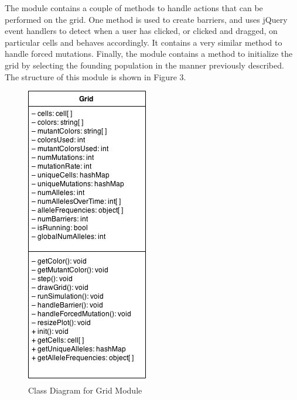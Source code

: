 \documentclass[12pt]{article}
\begin{document}
\begin{spacing}{1.5}
The module contains a couple of methods to handle actions that can be performed on the grid. One method is used to create barriers, and uses jQuery event handlers to detect when a user has clicked, or clicked and dragged, on particular cells and behaves accordingly. It contains a very similar method to handle forced mutations.\newline
\newline
Finally, the module contains a method to initialize the grid by selecting the founding population in the manner previously described. The structure of this module is shown in Figure 3.
\begin{figure}[h]
\caption{Class Diagram for Grid Module}
\centering
\includegraphics[scale=0.5]{grid-class-diagram}
\end{figure}


\end{spacing}
\end{document}
